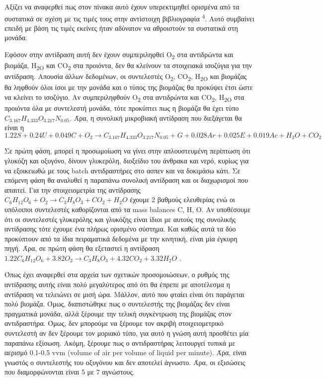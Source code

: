 \documentclass[11pt]{article}
\makeatletter
\newcommand{\citeprocitem}[2]{\hyper@linkstart{cite}{citeproc_bib_item_#1}#2\hyper@linkend}
\makeatother
\begin{document}
Αξίζει να αναφερθεί πως στον πίνακα αυτό έχουν υπερεκτιμηθεί ορισμένα από τα συστατικά σε σχέση με τις τιμές τους στην αντίστοιχη βιβλιογραφία \textsuperscript{\citeprocitem{4}{4}}. Αυτό συμβαίνει επειδή με βάση τις τιμές εκείνες ήταν αδύνατον να αθροιστούν τα συστατικά στη μονάδα.

Εφόσον στην αντίδραση αυτή δεν έχουν συμπεριληφθεί O\textsubscript{2} στα αντιδρώντα και βιομάζα, H\textsubscript{2O} και CO\textsubscript{2} στα προιόντα, δεν θα κλείνουν τα στοιχειακά ισοζύγια για την αντίδραση. Απουσία άλλων δεδομένων, οι συντελεστές Ο\textsubscript{2}, CO\textsubscript{2}, H\textsubscript{2O} και βιομάζας θα ληφθούν όλοι ίσοι με την μονάδα και ο τύπος της βιομάζας θα προκύψει έτσι ώστε να κλείνει το ισοζύγιο. Αν συμπεριληφθούν O\textsubscript{2} στα αντιδρώντα και CO\textsubscript{2}, H\textsubscript{2O} στα προιόντα όλα με συντελεστή μονάδα, τότε προκύπτει πως η βιομάζα θα έχει τύπο \(C_{3.167}H_{4.333}O_{3.217}N_{0.05}\). Άρα, η συνολική μικροβιακή αντίδραση που διεξάγεται θα είναι η
\[ 1.22S + 0.24U + 0.049C + O_2 \rightarrow C_{3.167}H_{4.333}O_{3.217}N_{0.05} + G + 0.028Ar +0.025E + 0.019Ac + H_2O +CO_2 \]

Σε πρώτη φάση, μπορεί η προσωμοίωση να γίνει στην απλουστευμένη περίπτωση ότι γλυκόζη και οξυγόνο, δίνουν γλυκερόλη, διοξείδιο του άνθρακα και νερό, κυρίως για να εξοικειωθώ με τους batch αντιδραστήρες στο ασπεν και να δοκιμάσω κάτι. Σε επόμενη φάση θα αναλυθεί η παραπάνω συνολική αντίδραση και οι διαχωρισμοί που απαιτεί. Για την στοιχειομετρία της αντίδρασης \(C_6H_{12}O_6 + O_2 \rightarrow C_3H_8O_3 + CO_2 +H_2O\) έχουμε 2 βαθμούς ελευθερίας ενώ οι υπόλοιποι συντελεστές καθορίζονται από τα mass balances C, H, O. Αν υποθέσουμε ότι οι συντελεστές γλυκερόλης και γλυκόζης είναι ίδιοι με αυτούς της συνολικής αντίδρασης τότε έχουμε ένα πλήρως ορισμένο σύστημα. Και καθώς αυτά τα δύο προκύπτουν από τα ίδια πειραματικά δεδομένα με την κινητική, είναι μία έγκυρη πηγή. Άρα, σε πρώτη φάση θα εξεταστεί η αντίδραση
\(1.22 C_6H_{12}O_6 + 3.82O_2 \rightarrow C_3H_8O_3 + 4.32CO_2 + 3.32H_2O\) .

Όπως έχει αναφερθεί στα αρχεία των σχετικών προσομοιώσεων, ο ρυθμός της αντίδρασης αυτής είναι πολύ μεγαλύτερος από ότι θα έπρεπε με αποτέλεσμα η αντίδραση να τελειώνει σε μισή ώρα. Μάλλον, αυτό που φταίει είναι ότι παράγεται πολύ βιομάζα. Όμως, διαπιστώθηκε πως ο συντελεστής της βιομάζας δεν είναι πραγματικά μονάδα, αλλά ξέρουμε την τελική συγκέντρωση της βιομάζας στον αντιδραστήρα. Όμως, δεν μπορούμε να ξέρουμε τον ακριβή στοιχειομετρικό συντελεστή αν δεν ξέρουμε τον μοριακό τύπο, για αυτό η γνώση αυτή προσθέτει μία παραπάνω εξίσωση. Ακόμη, ξέρουμε πως ο αντιδραστήρας λειτουργεί τυπικά με αερισμό 0.1-0.5 vvm (volume of air per volume of liquid per minute). Άρα, είναι γνωστός ο συντελεστής του οξυγόνου και δεν αποτελεί άγνωστο. Άρα, οι εξισώσεις που διαμορφώνονται είναι 5 με 7 αγνώστους.
\end{document}
